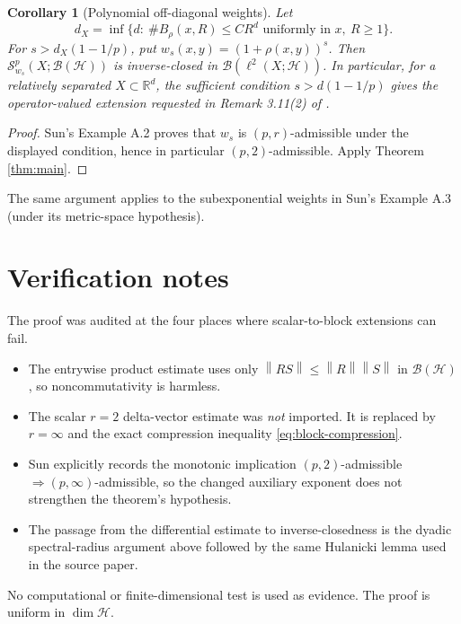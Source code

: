 \documentclass[11pt]{article}
\newtheorem{corollary}{Corollary}
\newcommand{\BH}{\mathcal B(\mathcal H)}
\newcommand{\norm}[1]{\left\lVert #1\right\rVert}
\begin{document}
\begin{corollary}[Polynomial off-diagonal weights]\label{cor:polynomial}
Let
\[
 d_X=\inf\{d:\ \#B_\rho(x,R)\le C R^d
                    \text{ uniformly in }x,\ R\ge1\}.
\]
For $s>d_X(1-1/p)$, put $w_s(x,y)=(1+\rho(x,y))^s$.  Then
$\mathcal S^p_{w_s}(X;\BH)$ is inverse-closed in
$\mathcal B(\ell^2(X;\mathcal H))$.
In particular, for a relatively separated $X\subset\mathbb R^d$, the
sufficient condition $s>d(1-1/p)$ gives the operator-valued extension
requested in Remark 3.11(2) of \cite{KB}.
\end{corollary}

\begin{proof}
Sun's Example A.2 proves that $w_s$ is $(p,r)$-admissible under the displayed
condition, hence in particular $(p,2)$-admissible.  Apply Theorem
\ref{thm:main}.
\end{proof}

The same argument applies to the subexponential weights in Sun's Example
A.3 (under its metric-space hypothesis).

\section*{Verification notes}

The proof was audited at the four places where scalar-to-block extensions
can fail.

\begin{itemize}
\item The entrywise product estimate uses only
      $\norm{RS}\le\norm R\norm S$ in $\BH$, so noncommutativity is harmless.
\item The scalar $r=2$ delta-vector estimate was \emph{not} imported.  It is
      replaced by $r=\infty$ and the exact compression inequality
      \eqref{eq:block-compression}.
\item Sun explicitly records the monotonic implication
      $(p,2)$-admissible $\Rightarrow(p,\infty)$-admissible, so the changed
      auxiliary exponent does not strengthen the theorem's hypothesis.
\item The passage from the differential estimate to inverse-closedness is
      the dyadic spectral-radius argument above followed by the same
      Hulanicki lemma used in the source paper.
\end{itemize}

No computational or finite-dimensional test is used as evidence.  The proof
is uniform in $\dim\mathcal H$.
\end{document}
